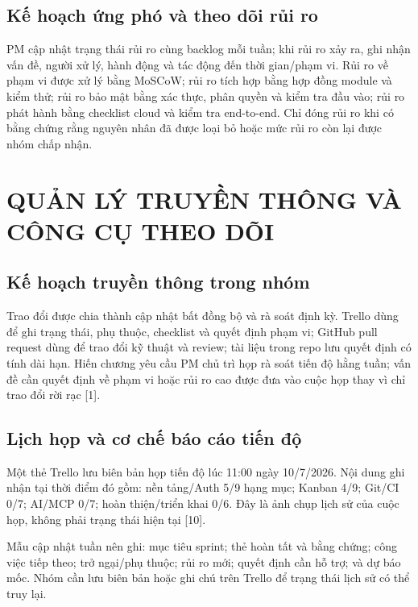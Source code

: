 \documentclass[12pt,a4paper]{report}
\begin{document}
\section{Kế hoạch ứng phó và theo dõi rủi ro}
PM cập nhật trạng thái rủi ro cùng backlog mỗi tuần; khi rủi ro xảy ra, ghi nhận vấn đề, người xử lý, hành động và tác động đến thời gian/phạm vi. Rủi ro về phạm vi được xử lý bằng MoSCoW; rủi ro tích hợp bằng hợp đồng module và kiểm thử; rủi ro bảo mật bằng xác thực, phân quyền và kiểm tra đầu vào; rủi ro phát hành bằng checklist cloud và kiểm tra end-to-end. Chỉ đóng rủi ro khi có bằng chứng rằng nguyên nhân đã được loại bỏ hoặc mức rủi ro còn lại được nhóm chấp nhận.

\chapter{QUẢN LÝ TRUYỀN THÔNG VÀ CÔNG CỤ THEO DÕI}
\section{Kế hoạch truyền thông trong nhóm}
Trao đổi được chia thành cập nhật bất đồng bộ và rà soát định kỳ. Trello dùng để ghi trạng thái, phụ thuộc, checklist và quyết định phạm vi; GitHub pull request dùng để trao đổi kỹ thuật và review; tài liệu trong repo lưu quyết định có tính dài hạn. Hiến chương yêu cầu PM chủ trì họp rà soát tiến độ hằng tuần; vấn đề cần quyết định về phạm vi hoặc rủi ro cao được đưa vào cuộc họp thay vì chỉ trao đổi rời rạc [1].

\section{Lịch họp và cơ chế báo cáo tiến độ}
Một thẻ Trello lưu biên bản họp tiến độ lúc 11:00 ngày 10/7/2026. Nội dung ghi nhận tại thời điểm đó gồm: nền tảng/Auth 5/9 hạng mục; Kanban 4/9; Git/CI 0/7; AI/MCP 0/7; hoàn thiện/triển khai 0/6. Đây là ảnh chụp lịch sử của cuộc họp, không phải trạng thái hiện tại [10].

Mẫu cập nhật tuần nên ghi: mục tiêu sprint; thẻ hoàn tất và bằng chứng; công việc tiếp theo; trở ngại/phụ thuộc; rủi ro mới; quyết định cần hỗ trợ; và dự báo mốc. Nhóm cần lưu biên bản hoặc ghi chú trên Trello để trạng thái lịch sử có thể truy lại.
\end{document}
